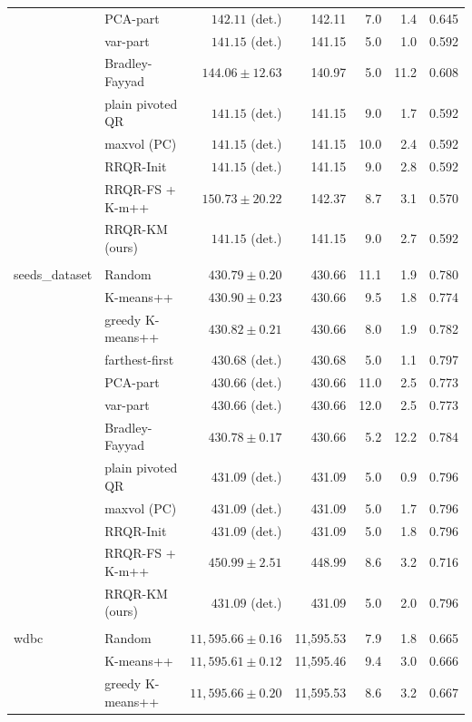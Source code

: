 \begin{table}[htbp]
{\begin{tabular}{llrrrrr}
 & PCA-part & $142.11$ (det.) & 142.11 & 7.0 & 1.4 & 0.645 \\
 & var-part & $141.15$ (det.) & 141.15 & 5.0 & 1.0 & 0.592 \\
 & Bradley-Fayyad & $144.06 \pm 12.63$ & 140.97 & 5.0 & 11.2 & 0.608 \\
 & plain pivoted QR & $141.15$ (det.) & 141.15 & 9.0 & 1.7 & 0.592 \\
 & maxvol (PC) & $141.15$ (det.) & 141.15 & 10.0 & 2.4 & 0.592 \\
 & RRQR-Init & $141.15$ (det.) & 141.15 & 9.0 & 2.8 & 0.592 \\
 & RRQR-FS + K-m++ & $150.73 \pm 20.22$ & 142.37 & 8.7 & 3.1 & 0.570 \\
 & RRQR-KM (ours) & $141.15$ (det.) & 141.15 & 9.0 & 2.7 & 0.592 \\
\addlinespace \\
seeds\_dataset & Random & $430.79 \pm 0.20$ & 430.66 & 11.1 & 1.9 & 0.780 \\
 & K-means++ & $430.90 \pm 0.23$ & 430.66 & 9.5 & 1.8 & 0.774 \\
 & greedy K-means++ & $430.82 \pm 0.21$ & 430.66 & 8.0 & 1.9 & 0.782 \\
 & farthest-first & $430.68$ (det.) & 430.68 & 5.0 & 1.1 & 0.797 \\
 & PCA-part & $430.66$ (det.) & 430.66 & 11.0 & 2.5 & 0.773 \\
 & var-part & $430.66$ (det.) & 430.66 & 12.0 & 2.5 & 0.773 \\
 & Bradley-Fayyad & $430.78 \pm 0.17$ & 430.66 & 5.2 & 12.2 & 0.784 \\
 & plain pivoted QR & $431.09$ (det.) & 431.09 & 5.0 & 0.9 & 0.796 \\
 & maxvol (PC) & $431.09$ (det.) & 431.09 & 5.0 & 1.7 & 0.796 \\
 & RRQR-Init & $431.09$ (det.) & 431.09 & 5.0 & 1.8 & 0.796 \\
 & RRQR-FS + K-m++ & $450.99 \pm 2.51$ & 448.99 & 8.6 & 3.2 & 0.716 \\
 & RRQR-KM (ours) & $431.09$ (det.) & 431.09 & 5.0 & 2.0 & 0.796 \\
\addlinespace \\
wdbc & Random & $11,595.66 \pm 0.16$ & 11,595.53 & 7.9 & 1.8 & 0.665 \\
 & K-means++ & $11,595.61 \pm 0.12$ & 11,595.46 & 9.4 & 3.0 & 0.666 \\
 & greedy K-means++ & $11,595.66 \pm 0.20$ & 11,595.53 & 8.6 & 3.2 & 0.667 \\

\end{tabular}}
\end{table}
